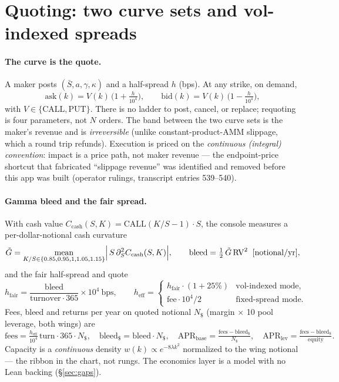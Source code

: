\documentclass[11pt]{article}
\newcommand{\Sbar}{\bar{S}}
\begin{document}
\section{Quoting: two curve sets and vol-indexed spreads}\label{sec:quoting}

\paragraph{The curve is the quote.} A maker posts $(\Sbar,a,\gamma,\kappa)$ and a half-spread
$h$ (bps). At any strike, on demand,
\begin{equation}
\mathrm{ask}(k) = V(k)\,\bigl(1+\tfrac{h}{10^4}\bigr), \qquad
\mathrm{bid}(k) = V(k)\,\bigl(1-\tfrac{h}{10^4}\bigr),
\end{equation}
with $V \in \{\mathrm{CALL},\mathrm{PUT}\}$. There is no ladder to post, cancel, or replace;
requoting is four parameters, not $N$ orders. The band between the two curve sets is the
maker's revenue and is \emph{irreversible} (unlike constant-product-AMM slippage, which a
round trip refunds). Execution is priced on the \emph{continuous (integral) convention}: impact
is a price path, not maker revenue --- the endpoint-price shortcut that fabricated ``slippage
revenue'' was identified and removed before this app was built (operator rulings, transcript
entries 539--540).

\paragraph{Gamma bleed and the fair spread.} With cash value
$C_{\text{cash}}(S,K) = \mathrm{CALL}(K/S-1)\cdot S$, the console measures a per-dollar-notional
cash curvature
\begin{equation}
\tilde G = \operatorname*{mean}_{K/S \in \{0.85,0.95,1,1.05,1.15\}}
\Bigl|\,S\,\partial^2_S C_{\text{cash}}(S,K)\Bigr|,
\qquad
\text{bleed} = \tfrac12\,\tilde G\,\mathrm{RV}^2 \;\;[\text{notional}/\text{yr}],
\end{equation}
and the fair half-spread and quote
\begin{equation}
h_{\text{fair}} = \frac{\text{bleed}}{\text{turnover}\cdot 365}\times 10^4\ \text{bps},
\qquad
h_{\text{eff}} =
\begin{cases}
h_{\text{fair}}\cdot(1+25\%) & \text{vol-indexed mode},\\
\text{fee}\cdot 10^4/2 & \text{fixed-spread mode}.
\end{cases}
\end{equation}
Fees, bleed and returns per year on quoted notional $N_\$$ (margin $\times$ 10 pool leverage,
both wings) are
\begin{equation}
\text{fees} = \tfrac{h_{\text{eff}}}{10^4}\,\text{turn}\cdot 365\cdot N_\$,\quad
\text{bleed}_\$ = \text{bleed}\cdot N_\$,\quad
\text{APR}_{\text{base}} = \tfrac{\text{fees}-\text{bleed}_\$}{N_\$},\quad
\text{APR}_{\text{lev}} = \tfrac{\text{fees}-\text{bleed}_\$}{\text{equity}}.
\end{equation}
Capacity is a \emph{continuous} density $w(k)\propto e^{-8\lambda k^2}$ normalized to the wing
notional --- the ribbon in the chart, not rungs. The economics layer is a model with no Lean
backing (\S\ref{sec:gaps}).
\end{document}
